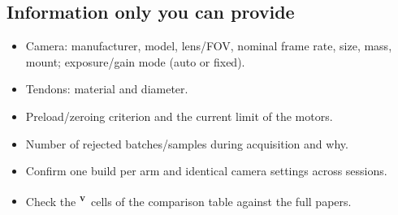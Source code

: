 \documentclass[10pt,a4paper]{article}
\newcommand{\vf}{\textsuperscript{\textcolor{orange!85!black}{\textbf{v}}}}
\begin{document}
\subsection{Information only you can provide}\label{sec:fill}
\begin{itemize}
\item Camera: manufacturer, model, lens/FOV, nominal frame rate, size, mass, mount; exposure/gain mode (auto or fixed).
\item Tendons: material and diameter.
\item Preload/zeroing criterion and the current limit of the motors.
\item Number of rejected batches/samples during acquisition and why.
\item Confirm one build per arm and identical camera settings across sessions.
\item Check the \vf\ cells of the comparison table against the full papers.
\end{itemize}
\end{document}
